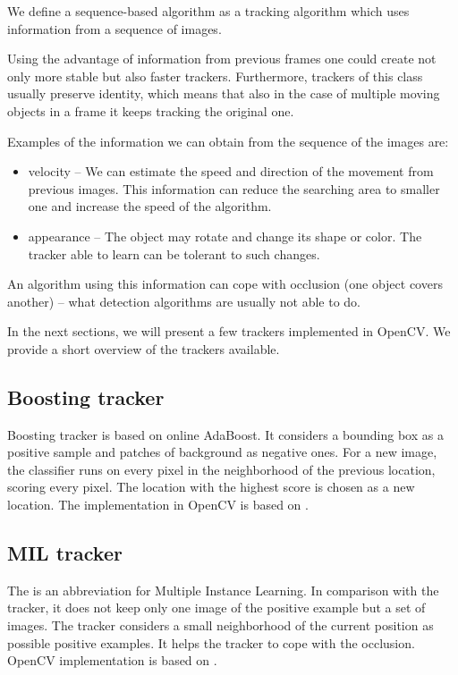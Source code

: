 We define a sequence-based algorithm as a tracking algorithm which uses
information from a sequence of images.

Using the advantage of information from previous frames one could create not
only more stable but also faster trackers. Furthermore, trackers of this class
usually preserve identity, which means that also in the case of multiple moving
objects in a frame it keeps tracking the original one.

Examples of the information we can obtain from the sequence of the images are:
\begin{itemize}
\item velocity -- We can estimate the speed and direction of
  the movement from previous images. This information can reduce the searching area to smaller one
  and increase the speed of the algorithm.
\item appearance -- The object may rotate and change its shape or color. The tracker able to
  learn can be tolerant to such changes.
\end{itemize}

An algorithm using this information can cope with occlusion (one object covers
another) -- what detection algorithms are usually not able to do.

In the next sections, we will present a few trackers implemented in OpenCV. We
provide a short overview of the trackers available.

\subsection*{Boosting tracker}
Boosting tracker is based on online AdaBoost. It considers a bounding box as a
positive sample and patches of background as negative ones. For a new image,
the classifier runs on every pixel in the neighborhood of the previous
location, scoring every pixel. The location with the highest score is chosen as
a new location. The implementation in OpenCV is based on \citet*{boosting}.

\subsection*{MIL tracker}
The \mil{} is an abbreviation for Multiple Instance Learning. In comparison
with the \boost{} tracker, it does not keep only one image of the positive
example but a set of images. The tracker considers a small neighborhood of the
current position as possible positive examples. It helps the tracker to cope
with the occlusion. OpenCV implementation is based on \citet*{mil}.

